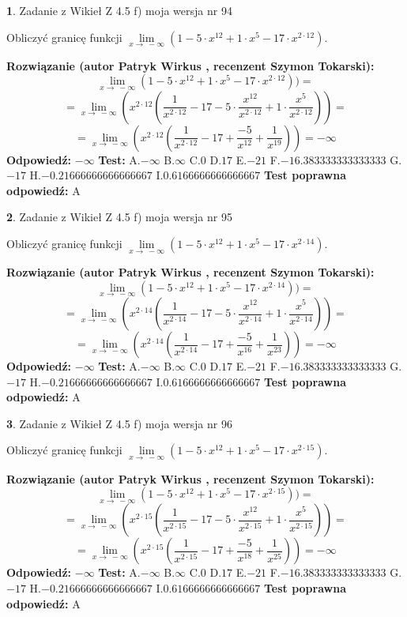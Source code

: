 \documentclass[12pt, a4paper]{article}
\theoremstyle{definition} %
\newtheorem{zad}{}
\newcommand{\zadStart}[1]{\begin{zad}#1\newline}
\newcommand{\zadStop}{\end{zad}}
\newcommand{\rozwStart}[2]{\noindent \textbf{Rozwiązanie (autor #1 , recenzent #2): }\newline}
\newcommand{\rozwStop}{\newline}
\newcommand{\odpStart}{\noindent \textbf{Odpowiedź:}\newline}
\newcommand{\odpStop}{\newline}
\newcommand{\testStart}{\noindent \textbf{Test:}\newline}
\newcommand{\testStop}{\newline}
\newcommand{\kluczStart}{\noindent \textbf{Test poprawna odpowiedź:}\newline}
\newcommand{\kluczStop}{\newline}
\begin{document}
\zadStart{Zadanie z Wikieł Z 4.5 f) moja wersja nr 94}


Obliczyć granicę funkcji  $\lim\limits_{x\to\ -\infty}(1 - 5 \cdot x^{12}+1 \cdot x^{5}- 17 \cdot x^{2\cdot12})$.
\zadStop
\rozwStart{Patryk Wirkus}{Szymon Tokarski}
$$\lim\limits_{x\to\ -\infty}(1 - 5 \cdot x^{12}+1 \cdot x^{5}- 17 \cdot x^{2\cdot12}))=$$
$$=\lim\limits_{x\to\ -\infty}(x^{2\cdot12}(\frac{1}{x^{2\cdot12}}-17 -5 \cdot \frac{x^{12}}{x^{2\cdot12}}+1 \cdot \frac{x^{5}}{x^{2\cdot12}}))=$$
$$=\lim\limits_{x\to\ -\infty}(x^{2\cdot12}(\frac{1}{x^{2\cdot12}}-17 + \frac{-5}{x^{12}}+ \frac{1}{x^{19}}))=-\infty$$
\rozwStop
\odpStart
$-\infty$
\odpStop
\testStart
A.$-\infty$ B.$\infty$ C.$0$ D.$17$ E.$-21$
F.$-16.383333333333333$ G.$-17$
H.$-0.21666666666666667$
I.$0.6166666666666667$
\testStop
\kluczStart
A
\kluczStop



\zadStart{Zadanie z Wikieł Z 4.5 f) moja wersja nr 95}


Obliczyć granicę funkcji  $\lim\limits_{x\to\ -\infty}(1 - 5 \cdot x^{12}+1 \cdot x^{5}- 17 \cdot x^{2\cdot14})$.
\zadStop
\rozwStart{Patryk Wirkus}{Szymon Tokarski}
$$\lim\limits_{x\to\ -\infty}(1 - 5 \cdot x^{12}+1 \cdot x^{5}- 17 \cdot x^{2\cdot14}))=$$
$$=\lim\limits_{x\to\ -\infty}(x^{2\cdot14}(\frac{1}{x^{2\cdot14}}-17 -5 \cdot \frac{x^{12}}{x^{2\cdot14}}+1 \cdot \frac{x^{5}}{x^{2\cdot14}}))=$$
$$=\lim\limits_{x\to\ -\infty}(x^{2\cdot14}(\frac{1}{x^{2\cdot14}}-17 + \frac{-5}{x^{16}}+ \frac{1}{x^{23}}))=-\infty$$
\rozwStop
\odpStart
$-\infty$
\odpStop
\testStart
A.$-\infty$ B.$\infty$ C.$0$ D.$17$ E.$-21$
F.$-16.383333333333333$ G.$-17$
H.$-0.21666666666666667$
I.$0.6166666666666667$
\testStop
\kluczStart
A
\kluczStop



\zadStart{Zadanie z Wikieł Z 4.5 f) moja wersja nr 96}


Obliczyć granicę funkcji  $\lim\limits_{x\to\ -\infty}(1 - 5 \cdot x^{12}+1 \cdot x^{5}- 17 \cdot x^{2\cdot15})$.
\zadStop
\rozwStart{Patryk Wirkus}{Szymon Tokarski}
$$\lim\limits_{x\to\ -\infty}(1 - 5 \cdot x^{12}+1 \cdot x^{5}- 17 \cdot x^{2\cdot15}))=$$
$$=\lim\limits_{x\to\ -\infty}(x^{2\cdot15}(\frac{1}{x^{2\cdot15}}-17 -5 \cdot \frac{x^{12}}{x^{2\cdot15}}+1 \cdot \frac{x^{5}}{x^{2\cdot15}}))=$$
$$=\lim\limits_{x\to\ -\infty}(x^{2\cdot15}(\frac{1}{x^{2\cdot15}}-17 + \frac{-5}{x^{18}}+ \frac{1}{x^{25}}))=-\infty$$
\rozwStop
\odpStart
$-\infty$
\odpStop
\testStart
A.$-\infty$ B.$\infty$ C.$0$ D.$17$ E.$-21$
F.$-16.383333333333333$ G.$-17$
H.$-0.21666666666666667$
I.$0.6166666666666667$
\testStop
\kluczStart
A
\kluczStop
\end{document}
